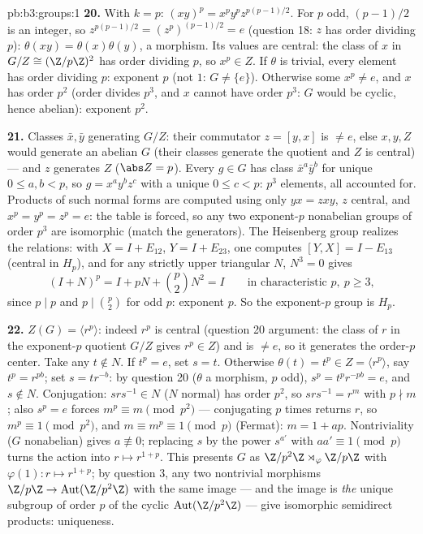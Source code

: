 \begin{solution}{pb:b3:groups:1}
\textbf{20.} With $k = p$: $(xy)^p = x^py^pz^{p(p-1)/2}$. For
$p$ odd, $(p-1)/2$ is an integer, so $z^{p(p-1)/2} =
(z^p)^{(p-1)/2} = e$ (question 18: $z$ has order dividing $p$):
$\theta(xy) = \theta(x)\theta(y)$, a morphism. Its values are
central: the class of $x$ in $G/Z \cong (\Z/p\Z)^2$ has order
dividing $p$, so $x^p \in Z$. If $\theta$ is trivial, every
element has order dividing $p$: exponent $p$ (not $1$: $G \neq
\{e\}$). Otherwise some $x^p \neq e$, and $x$ has order $p^2$
(order divides $p^3$, and $x$ cannot have order $p^3$: $G$
would be cyclic, hence abelian): exponent $p^2$.

\textbf{21.} Classes $\bar x, \bar y$ generating $G/Z$: their
commutator $z = [y, x]$ is $\neq e$, else $x, y, Z$ would
generate an abelian $G$ (their classes generate the quotient and
$Z$ is central) --- and $z$ generates $Z$ ($\abs Z = p$). Every
$g \in G$ has class $\bar x^a\bar y^b$ for unique $0 \leq a, b <
p$, so $g = x^ay^bz^c$ with a unique $0 \leq c < p$: $p^3$
elements, all accounted for. Products of such normal forms are
computed using only $yx = zxy$, $z$ central, and $x^p = y^p =
z^p = e$: the table is forced, so any two exponent-$p$
nonabelian groups of order $p^3$ are isomorphic (match the
generators). The Heisenberg group realizes the relations: with
$X = I + E_{12}$, $Y = I + E_{23}$, one computes $[Y, X] = I -
E_{13}$ (central in $H_p$), and for any strictly upper
triangular $N$, $N^3 = 0$ gives
\[
(I + N)^p = I + pN + \binom p2N^2 = I
\qquad\text{in characteristic } p,\ p \geq 3,
\]
since $p \mid p$ and $p \mid \binom p2$ for odd $p$: exponent
$p$. So the exponent-$p$ group is $H_p$.

\textbf{22.} $Z(G) = \langle r^p\rangle$: indeed $r^p$ is
central (question 20 argument: the class of $r$ in the
exponent-$p$ quotient $G/Z$ gives $r^p \in Z$) and is $\neq e$,
so it generates the order-$p$ center. Take any $t \notin N$. If
$t^p = e$, set $s = t$. Otherwise $\theta(t) = t^p \in Z =
\langle r^p\rangle$, say $t^p = r^{pb}$; set $s = tr^{-b}$: by
question 20 ($\theta$ a morphism, $p$ odd), $s^p =
t^pr^{-pb} = e$, and $s \notin N$. Conjugation: $srs^{-1} \in
N$ ($N$ normal) has order $p^2$, so $srs^{-1} = r^m$ with $p
\nmid m$; also $s^p = e$ forces $m^p \equiv m \pmod{p^2}$ ---
conjugating $p$ times returns $r$, so $m^p \equiv 1 \pmod
{p^2}$, and $m \equiv m^p \equiv 1 \pmod p$ (Fermat): $m = 1 +
ap$. Nontriviality ($G$ nonabelian) gives $a \not\equiv 0$;
replacing $s$ by the power $s^{a'}$ with $aa' \equiv 1 \pmod p$
turns the action into $r \mapsto r^{1+p}$. This presents $G$ as
$\Z/p^2\Z\rtimes_\varphi\Z/p\Z$ with $\varphi(1)\colon r
\mapsto r^{1+p}$; by question 3, any two nontrivial morphisms
$\Z/p\Z \to \operatorname{Aut}(\Z/p^2\Z)$ with the same image
--- and the image is \emph{the} unique subgroup of order $p$ of
the cyclic $\operatorname{Aut}(\Z/p^2\Z)$ --- give isomorphic
semidirect products: uniqueness.


\end{solution}
